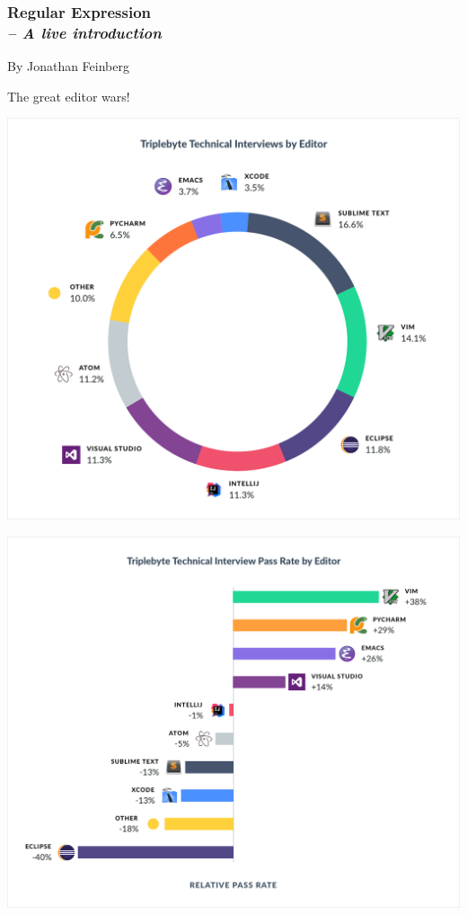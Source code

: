 \documentclass[norsk]{beamer}
\begin{document}
\begin{frame}
    \frametitle{Regular Expression \\\it{-- A live introduction}}
    By Jonathan Feinberg
\end{frame}

\begin{frame}{The great editor wars!}
\end{frame}

\begin{frame}[fragile]{}
\begin{center}
\includegraphics[width=.75\textwidth]{./editor_distribution.png}
\end{center}
\end{frame}

\begin{frame}[fragile]{}
\begin{center}
\includegraphics[width=.75\textwidth]{./editor_advantage.png}
\end{center}
\end{frame}
\end{document}
